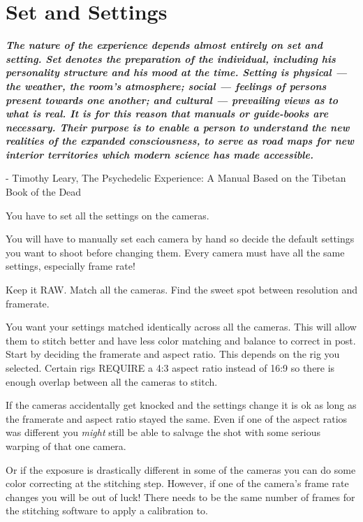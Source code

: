 \chapter{Set and Settings}
\pagecolor{white}
\label{chap:6}
\begin{fullwidth}


{\itshape\bfseries The nature of the experience depends almost entirely on set and setting. Set denotes the preparation of the individual, including his personality structure and his mood at the time. Setting is physical — the weather, the room’s atmosphere; social — feelings of persons present towards one another; and cultural — prevailing views as to what is real. It is for this reason that manuals or guide-books are necessary. Their purpose is to enable a person to understand the new realities of the expanded consciousness, to serve as road maps for new interior territories which modern science has made accessible.}

- Timothy Leary, The Psychedelic Experience: A Manual Based on the Tibetan Book of the Dead
\vspace{\baselineskip}

\problem

{\large You have to set all the settings on the cameras. \par}

You will have to manually set each camera by hand so decide the default settings you want to shoot before changing them. Every camera must have all the same settings, especially frame rate!

\solution

{\large Keep it RAW. Match all the cameras. Find the sweet spot between resolution and framerate. \par}

You want your settings matched identically across all the cameras. This will allow them to stitch better and have less color matching and balance to correct in post. Start by deciding the framerate and aspect ratio. This depends on the rig you selected. Certain rigs REQUIRE a 4:3 aspect ratio instead of 16:9 so there is enough overlap between all the cameras to stitch. 

If the cameras accidentally get knocked and the settings change it is ok as long as the framerate and aspect ratio stayed the same. Even if one of the aspect ratios was different you {\it might} still be able to salvage the shot with some serious warping of that one camera. 

Or if the exposure is drastically different in some of the cameras you can do some color correcting at the stitching step. However, if one of the camera’s frame rate changes you will be out of luck! There needs to be the same number of frames for the stitching software to apply a calibration to. 


\end{fullwidth}

